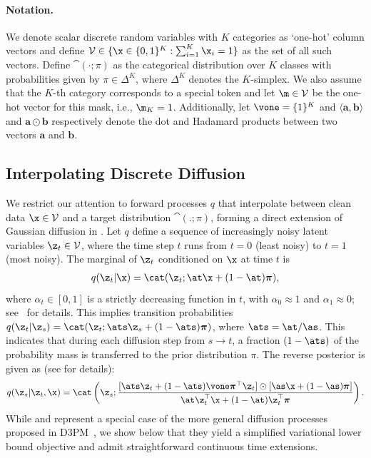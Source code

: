 \documentclass{article} %
\def\prior{\text{$\boldsymbol{\mathit{\pi}}$}}
\def\onehotset{\mathcal{V}}
\begin{document}
\paragraph{Notation.}
We denote scalar discrete random variables with $K$ categories as `one-hot' column vectors and define $\onehotset \in \{\x \in \{0, 1\}^K: \sum_{i=1}^K \x_i = 1\}$ as the set of all such vectors.
Define $\cat(\cdot;\prior)$ as the categorical distribution over $K$ classes with probabilities given by $\prior \in \Delta^{K}$, where $\Delta^{K}$ denotes the $K$-simplex.
We also assume that 
the $K$-th category
corresponds to a special \mask token and let $\m \in \onehotset$ be the one-hot vector for this mask, i.e., $\m_{K} = 1$.
Additionally, let $\vone = \{1\}^{K}$ and
$\langle \mathbf{a}, \mathbf{b} \rangle$ and $\mathbf{a} \odot \mathbf{b}$ respectively denote the dot and Hadamard products between two vectors $\mathbf{a}$ and $\mathbf{b}$.

\subsection{Interpolating Discrete Diffusion}\label{sec:interpolating_diffusion}


We restrict our attention to
forward processes $q$
that interpolate between clean data $\x \in \onehotset$ and a target distribution $\cat(.; \prior{})$, forming a direct extension of Gaussian diffusion in .
Let $q$ define a sequence of increasingly noisy latent variables $\z_t \in \onehotset$, where the time step $t$ runs from $t=0$ (least noisy) to $t=1$ (most noisy).
The marginal of $\z_t$ conditioned on $\x$ at time $t$ is  %
\begin{align}\label{eqn:interpolating_forward}
    q(\z_t | \x) = \cat(\z_t; \at \x + (1 - \at) \prior{}),
\end{align}
where $\alpha_t \in [0, 1]$
is a strictly decreasing function in $t$, with $\alpha_{0} \approx 1$ and $\alpha_{1} \approx 0$; see~ for details.
This implies transition probabilities $q(\z_t | \z_s) = \cat(\z_t ; \ats \z_s + (1 - \ats) \prior{})$, where $\ats = \at/\as$. This indicates that during each diffusion step from $s \to t$,
a fraction $(1 - \ats)$ of the probability mass is transferred to the prior distribution $\prior{}$.
The reverse posterior is given as (see  for details):
\begin{align}\label{eqn:true_posterior_unsimplified}
    q(\z_s | \z_t, \x) =
        \cat \left(\z_s;
            \frac{[\ats \z_t + (1 - \ats)\vone \prior^\top \z_t]  \odot [\as \x + (1 - \as) \prior]}{
             \at \z_t^\top \x  + (1 - \at)\z_t^\top\prior} \right).
\end{align}
While  and  represent a special case of the more general diffusion processes proposed in D3PM~\citep{austin2021structured},
we show below that they yield a simplified variational lower bound objective and admit straightforward continuous time extensions.
\end{document}
